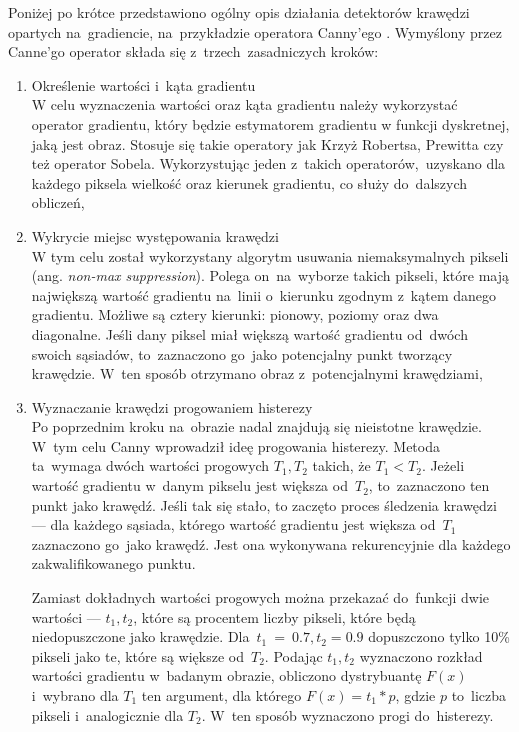 \documentclass[a4paper,11pt,twoside,openright]{report}
\theoremstyle{definition}
\begin{document}
Poniżej po krótce przedstawiono ogólny opis działania detektorów krawędzi opartych na~gradiencie,
na~przykładzie operatora Canny'ego \cite{Canny}. Wymyślony przez Canne'go operator
składa się z~trzech~zasadniczych kroków:
\begin{enumerate}%
\item Określenie wartości i~kąta gradientu \\
W celu wyznaczenia wartości oraz kąta gradientu należy wykorzystać operator gradientu,
który będzie estymatorem gradientu w funkcji dyskretnej, jaką jest obraz.
Stosuje się takie operatory jak Krzyż Robertsa, Prewitta czy też operator Sobela.
Wykorzystując jeden z~takich operatorów,~uzyskano dla każdego piksela wielkość oraz
kierunek gradientu, co służy do~dalszych obliczeń,
\item Wykrycie miejsc występowania krawędzi \\
W tym celu został wykorzystany algorytm usuwania niemaksymalnych pikseli
(ang. \textit{non-max suppression}). Polega on~na~wyborze
takich pikseli, które mają największą wartość gradientu na~linii o~kierunku
zgodnym z~kątem danego gradientu. Możliwe są cztery kierunki: pionowy, poziomy oraz
dwa diagonalne. Jeśli dany piksel miał większą wartość gradientu od~dwóch swoich
sąsiadów, to~zaznaczono go~jako potencjalny punkt tworzący krawędzie. W~ten sposób
otrzymano obraz z~potencjalnymi krawędziami,
\item Wyznaczanie krawędzi progowaniem histerezy \\
Po poprzednim kroku na~obrazie nadal znajdują się nieistotne krawędzie. W~tym celu
Canny wprowadził ideę progowania histerezy. Metoda ta~wymaga dwóch wartości progowych
$T_1, T_2$ takich, że $T_1 < T_2$. Jeżeli wartość gradientu w~danym pikselu jest
większa od~$T_2$, to~zaznaczono ten punkt jako krawędź. Jeśli tak się stało, to
zaczęto proces śledzenia krawędzi --- dla każdego sąsiada, którego wartość gradientu
jest większa od~$T_1$ zaznaczono go~jako krawędź. Jest ona wykonywana rekurencyjnie
dla każdego zakwalifikowanego punktu.

Zamiast dokładnych wartości progowych można przekazać do~funkcji dwie wartości ---
$t_1, t_2$, które są procentem liczby pikseli, które będą niedopuszczone jako
krawędzie. Dla~$t_1~=~0.7, t_2 = 0.9$ dopuszczono tylko 10\% pikseli jako te,
które są większe od~$T_2$. Podając $t_1, t_2$ wyznaczono rozkład wartości
gradientu w~badanym obrazie, obliczono dystrybuantę $F(x)$ i~wybrano dla $T_1$
ten argument, dla którego $F(x) = t_1 * p$, gdzie $p$ to~liczba pikseli i~analogicznie
dla $T_2$. W~ten sposób wyznaczono progi do~histerezy.

\end{enumerate}
\end{document}
